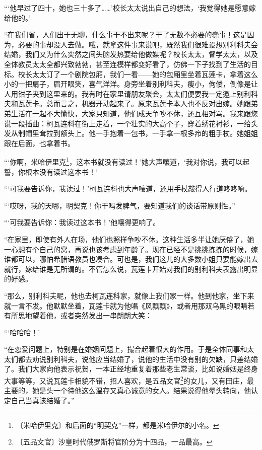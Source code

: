 \documentclass[12pt,UTF-8,openany]{ctexbook}
\begin{document}
\begin{normalsize}
    “‘他早过了四十，她也三十多了……’校长太太说出自己的想法，‘我觉得她是愿意嫁给他的。’
    
    “在我们省，人们出于无聊，什么事干不出来呢？干了无数不必要的蠢事！这是因为，必要的事却没人去做。哦，就拿这件事来说吧，既然我们很难设想别利科夫会结婚，我们又为什么突然之间头脑发热要给他做媒呢？校长太太，督学太太，以及全体教员太太全都兴致勃勃，甚至连模样都变好看了，仿佛一下子找到了生活的目标。校长太太订了一个剧院包厢，我们一看——她的包厢里坐着瓦莲卡，拿着这么小的一把扇子，眉开眼笑，喜气洋洋。身旁坐着别利科夫，瘦小，佝偻，倒像是让人用钳子夹到这里来的。我有时在家里请朋友聚会，太太们便要我一定邀上别利科夫和瓦莲卡。总而言之，机器开动起来了。原来瓦莲卡本人也不反对出嫁。她跟弟弟生活在一起不大愉快，大家只知道，他们成天争吵不休，还互相对骂。我来跟您说一段插曲：柯瓦连科在街上走着，一个壮实的大高个子，穿着绣花衬衫，一给头发从制帽里耷拉到额头上。他一手抱着一包书，一手拿一根多疖的粗手杖。她姐姐跟在后面，也拿着书。
    
    “‘你啊，米哈伊里克\footnote{〔米哈伊里克〕和后面的“明契克”一样，都是米哈伊尔的小名。}，这本书就没有读过！’她大声嚷道，‘我对你说，我可以起誓，你根本没有读过这本书！’
    
    “‘可我要告诉你，我读过！’柯瓦连科也大声嚷道，还用手杖敲得人行道咚咚响。
    
    “‘哎呀，我的天哪，明契克！你干吗发脾气，要知道我们的谈话带原则性。”
    
    “‘可我要告诉你：我读过这本书！’他嚷得更响了。
    
    “在家里，即使有外人在场，他们也照样争吵不休。这种生活多半让她厌倦了，她一心想有个自己的窝，再说也该考虑到年龄了。现在已经不是挑挑拣拣的时候，嫁谁都可以，哪怕希腊语教员也凑合。可也是，我们这儿的大多数小姐只要能嫁出去就行，嫁给谁是无所谓的。不管怎么说，瓦莲卡开始对我们的别利科夫表露出明显的好感。
    
    “那么，别利科夫呢，他也去柯瓦连科家，就像上我们家一样。他到他家，坐下来就一言不发。他默默坐着，瓦莲卡就为他唱《风飘飘》，或者用那双乌黑的眼睛若有所思地望着他，或者突然发出一串朗朗大笑：
    
    “‘哈哈哈！’
    
    “在恋爱问题上，特别是在婚姻问题上，撮合起着很大的作用。于是全体同事和太太们都去劝说别利科夫，说他应当结婚了，说他的生活中没有别的欠缺，只差结婚了。我们大家向他表示祝贺，一本正经地重复着那些老生常谈，比如说婚姻是终身大事等等，又说瓦莲卡相貌不错，招人喜欢，是五品文官\footnote{〔五品文官〕沙皇时代俄罗斯将官阶分为十四品，一品最高。}的女儿，又有田庄，最主要的，她是头一个待他这么温存又真心诚意的女人。结果说得他晕头转向，他认定自己当真该结婚了。”
    

\end{normalsize}
\end{document}

